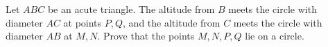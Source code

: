 Let $ABC$ be an acute triangle. The altitude from $B$ meets the circle with diameter $AC$ at points $P,Q$, and the altitude from $C$ meets the circle with diameter $AB$ at $M,N$. Prove that the points $M,N,P,Q$ lie on a circle.